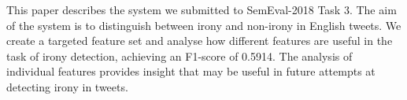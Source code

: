 This paper describes the system we submitted to SemEval-2018 Task 3. The aim of the system is to distinguish between irony and non-irony in English tweets. We create a targeted feature set and analyse how different features are useful in the task of irony detection, achieving an F1-score of 0.5914. The analysis of individual features provides insight that may be useful in future attempts at detecting irony in tweets.

